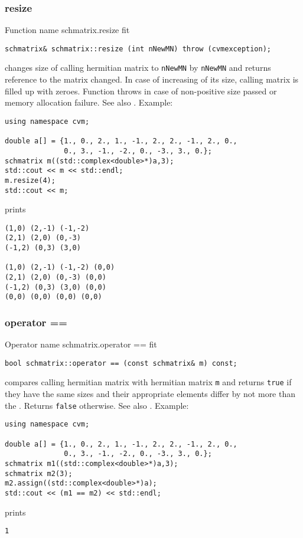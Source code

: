 \subsubsection{resize}
Function%
\pdfdest name {schmatrix.resize} fit
\begin{verbatim}
schmatrix& schmatrix::resize (int nNewMN) throw (cvmexception);
\end{verbatim}
changes  size of  calling hermitian matrix to \verb"nNewMN" by \verb"nNewMN"
and returns  reference to
the matrix changed. In case of increasing of its size, calling matrix
is filled up with zeroes. 
Function throws  
in case of non-positive size passed or memory allocation failure.
See also 
.
Example:
\begin{Verbatim}
using namespace cvm;

double a[] = {1., 0., 2., 1., -1., 2., 2., -1., 2., 0.,
              0., 3., -1., -2., 0., -3., 3., 0.};
schmatrix m((std::complex<double>*)a,3);
std::cout << m << std::endl;
m.resize(4);
std::cout << m;
\end{Verbatim}
prints
\begin{Verbatim}
(1,0) (2,-1) (-1,-2)
(2,1) (2,0) (0,-3)
(-1,2) (0,3) (3,0)

(1,0) (2,-1) (-1,-2) (0,0)
(2,1) (2,0) (0,-3) (0,0)
(-1,2) (0,3) (3,0) (0,0)
(0,0) (0,0) (0,0) (0,0)
\end{Verbatim}
\newpage




\subsubsection{operator ==}
Operator%
\pdfdest name {schmatrix.operator ==} fit
\begin{verbatim}
bool schmatrix::operator == (const schmatrix& m) const;
\end{verbatim}
compares  calling hermitian matrix with  hermitian matrix \verb"m"
and returns \verb"true" if they have the same sizes
and their appropriate elements differ by not more than the
.
Returns \verb"false" otherwise.
See also .
Example:
\begin{Verbatim}
using namespace cvm;

double a[] = {1., 0., 2., 1., -1., 2., 2., -1., 2., 0.,
              0., 3., -1., -2., 0., -3., 3., 0.};
schmatrix m1((std::complex<double>*)a,3);
schmatrix m2(3);
m2.assign((std::complex<double>*)a);
std::cout << (m1 == m2) << std::endl;
\end{Verbatim}
prints
\begin{Verbatim}
1
\end{Verbatim}
\newpage




